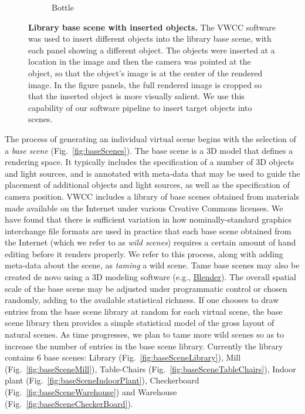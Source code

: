 \documentclass{jov}
\begin{document}
\begin{figure}
\begin{subfigure}[b]{0.14 \textwidth}
        \caption{Bottle}
        \label{fig:libraryWithChampagneBottle}
    \end{subfigure}
\caption{{\bf Library base scene with inserted objects.} The VWCC software was used to insert different objects into the library base scene, with each panel showing a different object. The objects were inserted at a location in the image and then the camera was pointed at the object, so that the object's image is at the center of the rendered image.  In the figure panels, the full rendered image is cropped so that the inserted object is more visually salient. We use this capability of our software pipeline to insert target objects into scenes.}\label{fig:libraryWithTarget}
\end{figure}

The process of generating an individual virtual scene begins with the selection of a \textit{base scene} (Fig.~\ref{fig:baseScenes}). The base scene is a 3D model that defines a rendering space.  It typically includes the specification of a number of 3D objects and light sources, and is annotated with meta-data that may be used to guide the placement of additional objects and light sources, as well as the specification of camera position. VWCC includes a library of base scenes obtained from materials made available on the Internet under various Creative Commons licenses. We have found that there is sufficient variation in how nominally-standard graphics interchange file formats are used in practice that each base scene obtained from the Internet (which we refer to as \textit{wild scenes}) requires a certain amount of hand editing before it renders properly. We refer to this process, along with adding meta-data about the scene, as \textit{taming} a wild scene. Tame base scenes may also be created de novo using a 3D modeling software (e.g., \href{https://www.blender.org/}{Blender}).  The overall spatial scale of the base scene may be adjusted under programmatic control or chosen randomly, adding to the available statistical richness. If one chooses to draw entries from the base scene library at random for each virtual scene, the base scene library then provides a simple statistical model of the gross layout of natural scenes. As time progresses, we plan to tame more wild scenes so as to increase the number of entries in the base scene library. Currently the library contains 6 base scenes: Library (Fig.~\ref{fig:baseSceneLibrary}), Mill (Fig.~\ref{fig:baseSceneMill}), Table-Chairs (Fig.~\ref{fig:baseSceneTableChairs}), Indoor plant (Fig.~\ref{fig:baseSceneIndoorPlant}), Checkerboard (Fig.~\ref{fig:baseSceneWarehouse}) and Warehouse (Fig.~\ref{fig:baseSceneCheckerBoard}).
\end{document}
